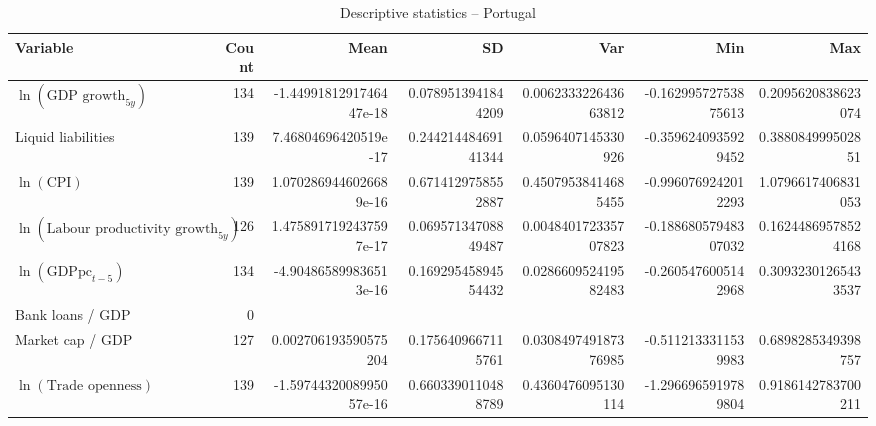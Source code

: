 \begin{table}[!htbp]
\centering
\caption{Descriptive statistics -- Portugal}
\footnotesize
\begin{tabular}{lrrrrrr}
\toprule
Variable & Count & Mean & SD & Var & Min & Max \\
\midrule
$\ln(\text{GDP growth}_{5y})$ & 134 & -1.4499181291746447e-18 & 0.0789513941844209 & 0.006233322643663812 & -0.16299572753875613 & 0.2095620838623074 \\
Liquid liabilities & 139 & 7.46804696420519e-17 & 0.24421448469141344 & 0.0596407145330926 & -0.3596240935929452 & 0.388084999502851 \\
$\ln(\text{CPI})$ & 139 & 1.0702869446026689e-16 & 0.6714129758552887 & 0.45079538414685455 & -0.9960769242012293 & 1.0796617406831053 \\
$\ln(\text{Labour productivity growth}_{5y})$ & 126 & 1.4758917192437597e-17 & 0.06957134708849487 & 0.004840172335707823 & -0.18868057948307032 & 0.16244869578524168 \\
$\ln(\text{GDPpc}_{t-5})$ & 134 & -4.904865899836513e-16 & 0.16929545894554432 & 0.028660952419582483 & -0.2605476005142968 & 0.30932301265433537 \\
Bank loans / GDP & 0 &  &  &  &  &  \\
Market cap / GDP & 127 & 0.002706193590575204 & 0.1756409667115761 & 0.030849749187376985 & -0.5112133311539983 & 0.6898285349398757 \\
$\ln(\text{Trade openness})$ & 139 & -1.5974432008995057e-16 & 0.6603390110488789 & 0.4360476095130114 & -1.2966965919789804 & 0.9186142783700211 \\
\bottomrule
\end{tabular}
\end{table}


